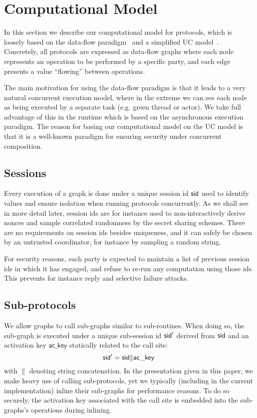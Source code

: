 \section{Computational Model}

In this section we describe our computational model for protocols, which is loosely based on the data-flow paradigm~\cite{abadi16} and a simplified UC model~\cite{canetti-cohen-lindell15}. Concretely, all protocols are expressed as data-flow graphs where each node represents an operation to be performed by a specific party, and each edge presents a value ``flowing'' between operations.

The main motivation for using the data-flow paradigm is that it leads to a very natural concurrent execution model, where in the extreme we can see each node as being executed by a separate task (e.g. green thread or actor). We take full advantage of this in the runtime which is based on the asynchronous execution paradigm. The reason for basing our computational model on the UC model is that it is a well-known paradigm for ensuring security under concurrent composition.


\subsection{Sessions}

Every execution of a graph is done under a unique session id $\mathsf{sid}$ used to identify values and ensure isolation when running protocols concurrently. As we shall see in more detail later, session ids are for instance used to non-interactively derive nonces and sample correlated randomness by the secret sharing schemes. There are no requirements on session ids besides uniqueness, and it can safely be chosen by an untrusted coordinator, for instance by sampling a random string.

For security reasons, each party is expected to maintain a list of previous session ids in which it has engaged, and refuse to re-run any computation using those ids. This prevents for instance reply and selective failure attacks.


\subsection{Sub-protocols}

We allow graphs to call sub-graphs similar to sub-routines. When doing so, the sub-graph is executed under a unique sub-session id $\mathsf{sid}'$ derived from $\mathsf{sid}$ and an activation key $\mathsf{ac\_key}$ statically related to the call site: 
$$
\mathsf{sid}' = \mathsf{sid} \| \mathsf{ac\_key}
$$
with $\|$ denoting string concatenation. In the presentation given in this paper, we make heavy use of calling sub-protocols, yet we typically (including in the current implementation) inline their sub-graphs for performance reasons. To do so securely, the activation key associated with the call site is embedded into the sub-graphs's operations during inlining.

